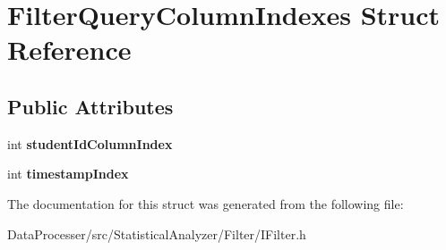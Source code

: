 \hypertarget{structFilterQueryColumnIndexes}{}\section{Filter\+Query\+Column\+Indexes Struct Reference}
\label{structFilterQueryColumnIndexes}
\subsection*{Public Attributes}
\begin{DoxyCompactItemize}
\item 
\mbox{\label{structFilterQueryColumnIndexes_ae2be76e71ebf2718ad78161781ed7e44}} 
int {\bfseries student\+Id\+Column\+Index}
\item 
\mbox{\label{structFilterQueryColumnIndexes_a3db0840c5f0343b63bd08d6444ac0f3e}} 
int {\bfseries timestamp\+Index}
\end{DoxyCompactItemize}


The documentation for this struct was generated from the following file\+:\begin{DoxyCompactItemize}
\item 
Data\+Processer/src/\+Statistical\+Analyzer/\+Filter/I\+Filter.\+h\end{DoxyCompactItemize}
